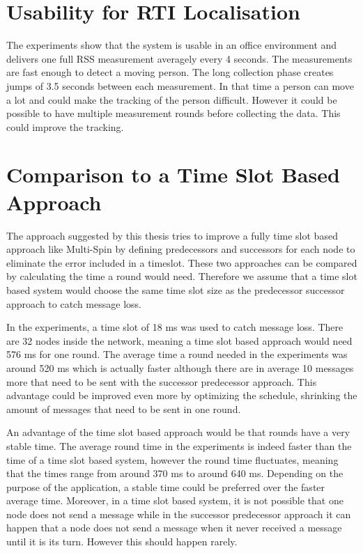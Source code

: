 \section{Usability for RTI Localisation}
The experiments show that the system is usable in an office environment and delivers one full RSS measurement averagely every 4 seconds. The measurements are fast enough to detect a moving person. The long collection phase creates jumps of 3.5 seconds between each measurement. In that time a person can move a lot and could make the tracking of the person difficult. However it could be possible to have multiple measurement rounds before collecting the data. This could improve the tracking.

\section{Comparison to a Time Slot Based Approach}
The approach suggested by this thesis tries to improve a fully time slot based approach like Multi-Spin by defining predecessors and successors for each node to eliminate the error included in a timeslot. 
These two approaches can be compared by calculating the time a round would need. Therefore we assume that a time slot based system would choose the same time slot size as the predecessor successor approach to catch message loss.

In the experiments, a time slot of 18 ms was used to catch message loss. There are 32 nodes inside the network, meaning a time slot based approach would need 576 ms for one round. The average time a round needed in the experiments was around 520 ms which is actually faster although there are in average 10 messages more that need to be sent with the successor predecessor approach. This advantage could be improved even more by optimizing the schedule, shrinking the amount of messages that need to be sent in one round.  

An advantage of the time slot based approach would be that rounds have a very stable time. The average round time in the experiments is indeed faster than the time of a time slot based system, however the round time fluctuates, meaning that the times range from around 370 ms to around 640 ms. Depending on the purpose of the application, a stable time could be preferred over the faster average time. Moreover, in a time slot based system, it is not possible that one node does not send a message while in the successor predecessor approach it can happen that a node does not send a message when it never received a message until it is its turn. However this should happen rarely.